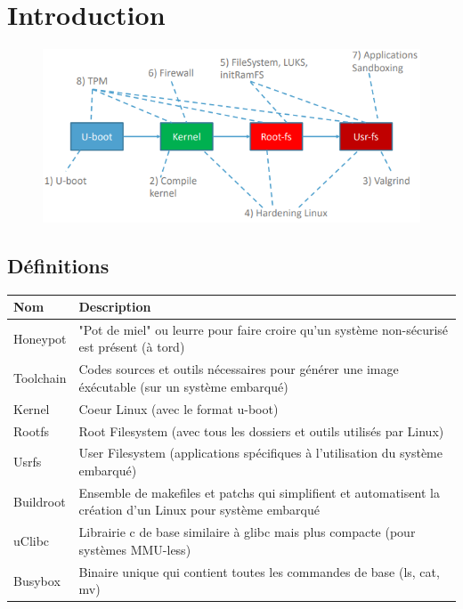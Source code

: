 \documentclass[resume]{subfiles}
\begin{document}
\section{Introduction}
\begin{figure}[H]
\centering
\includegraphics[width=\columnwidth]{img_0.png}
\end{figure}
\subsection{Définitions}
\begin{table}[H]
\begin{tabular}{ll}
Nom & Description\\\hline
Honeypot & "Pot de miel" ou leurre pour faire croire qu'un système non-sécurisé est présent (à tord)\\
Toolchain & Codes sources et outils nécessaires pour générer une image éxécutable (sur un système embarqué)\\
Kernel & Coeur Linux (avec le format u-boot)\\
Rootfs & Root Filesystem (avec tous les dossiers et outils utilisés par Linux)\\
Usrfs & User Filesystem (applications spécifiques à l'utilisation du système embarqué)\\
Buildroot & Ensemble de makefiles et patchs qui simplifient et automatisent la création d'un Linux pour système embarqué\\
uClibc & Librairie c de base similaire à glibc mais plus compacte (pour systèmes MMU-less)\\
Busybox & Binaire unique qui contient toutes les commandes de base (ls, cat, mv)
\end{tabular}
\end{table}
\end{document}
